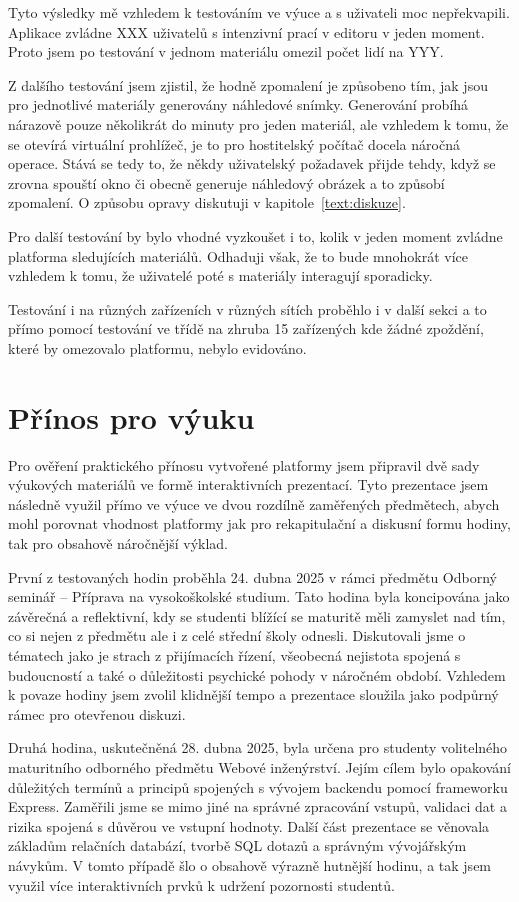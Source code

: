 Tyto výsledky mě vzhledem k testováním ve výuce a s uživateli moc nepřekvapili.
Aplikace zvládne XXX uživatelů s intenzivní prací v editoru v jeden moment.
Proto jsem po testování v jednom materiálu omezil počet lidí na YYY.

Z dalšího testování jsem zjistil, že hodně zpomalení je způsobeno tím, jak jsou pro jednotlivé materiály generovány náhledové snímky.
Generování probíhá nárazově pouze několikrát do minuty pro jeden materiál, ale vzhledem k tomu, že se otevírá virtuální prohlížeč, je to pro hostitelský počítač docela náročná operace.
Stává se tedy to, že někdy uživatelský požadavek přijde tehdy, když se zrovna spouští okno či obecně generuje náhledový obrázek a to způsobí zpomalení.
O způsobu opravy diskutuji v kapitole~\ref{text:diskuze}.

Pro další testování by bylo vhodné vyzkoušet i to, kolik v jeden moment zvládne platforma sledujících materiálů.
Odhaduji však, že to bude mnohokrát více vzhledem k tomu, že uživatelé poté s materiály interagují sporadicky.

Testování i na různých zařízeních v různých sítích proběhlo i v další sekci a to přímo pomocí testování ve třídě na zhruba 15 zařízených kde žádné zpoždění, které by omezovalo platformu, nebylo evidováno.

\section{Přínos pro výuku}

Pro ověření praktického přínosu vytvořené platformy jsem připravil dvě sady výukových materiálů ve formě interaktivních prezentací. 
Tyto prezentace jsem následně využil přímo ve výuce ve dvou rozdílně zaměřených předmětech, abych mohl porovnat vhodnost platformy jak pro rekapitulační a diskusní formu hodiny, tak pro obsahově náročnější výklad.

První z testovaných hodin proběhla 24. dubna 2025 v rámci předmětu Odborný seminář -- Příprava na vysokoškolské studium. 
Tato hodina byla koncipována jako závěrečná a reflektivní, kdy se studenti blížící se maturitě měli zamyslet nad tím, co si nejen z předmětu ale i z celé střední školy odnesli. 
Diskutovali jsme o tématech jako je strach z přijímacích řízení, všeobecná nejistota spojená s budoucností a také o důležitosti psychické pohody v náročném období. 
Vzhledem k povaze hodiny jsem zvolil klidnější tempo a prezentace sloužila jako podpůrný rámec pro otevřenou diskuzi.

Druhá hodina, uskutečněná 28. dubna 2025, byla určena pro studenty volitelného maturitního odborného předmětu Webové inženýrství. 
Jejím cílem bylo opakování důležitých termínů a principů spojených s vývojem backendu pomocí frameworku Express. 
Zaměřili jsme se mimo jiné na správné zpracování vstupů, validaci dat a rizika spojená s důvěrou ve vstupní hodnoty. 
Další část prezentace se věnovala základům relačních databází, tvorbě SQL dotazů a správným vývojářským návykům. 
V tomto případě šlo o obsahově výrazně hutnější hodinu, a tak jsem využil více interaktivních prvků k udržení pozornosti studentů.

